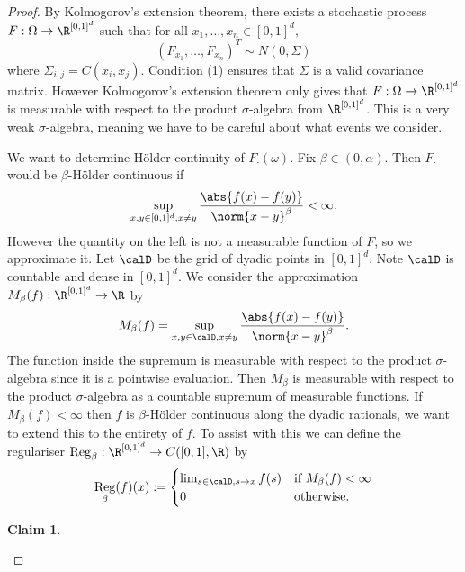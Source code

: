 \documentclass[fontsize=12pt, DIV=10]{scrreprt}
\theoremstyle{mydefn}
\newtheorem{claim}{Claim}
\theoremstyle{remark}
\newcommand{\defeq}{:=}
\DeclareMathOperator{\reg}{Reg}
\begin{document}
\begin{proof}
	By Kolmogorov's extension theorem, there exists a stochastic process $F: \Omega \to \boxspace$ such that for all $x_1, \ldots, x_n \in [0, 1]^d$, 
	\begin{equation}
		(F_{x_1}, \ldots, F_{x_n})^T
		\sim N(0, \Sigma)
	\end{equation}
	where $\Sigma_{i,j} = C(x_i, x_j)$. Condition (1) ensures that $\Sigma$ is a valid covariance matrix. However Kolmogorov's extension theorem only gives that $F: \Omega \to \boxspace$ is measurable with respect to the product $\sigma$-algebra from $\boxspace$. This is a very weak $\sigma$-algebra, meaning we have to be careful about what events we consider.

	We want to determine H\"older continuity of $F_{\cdot}(\omega)$. Fix $\beta \in (0, \alpha)$. Then $F_{\cdot}$ would be $\beta$-H\"older continuous if
	\begin{equation}
		\sup_{x, y \in [0, 1]^d, x \neq y} \frac{\abs{f(x) - f(y)}}{\norm{x - y}^{\beta}} < \infty.
	\end{equation}
	However the quantity on the left is not a measurable function of $F$, so we approximate it. Let $\calD$ be the grid of dyadic points in $[0, 1]^d$. Note $\calD$ is countable and dense in $[0, 1]^d$. We consider the approximation $M_{\beta}(f): \boxspace \to \R$ by
	\begin{equation}
		M_{\beta}(f) = \sup_{x, y \in \calD, x \neq y} \frac{\abs{f(x) - f(y)}}{\norm{x - y}^{\beta}}.
	\end{equation}
	The function inside the supremum is measurable with respect to the product $\sigma$-algebra since it is a pointwise evaluation. Then $M_{\beta}$ is measurable with respect to the product $\sigma$-algebra as a countable supremum of measurable functions. If $M_{\beta}(f) < \infty$ then $f$ is $\beta$-H\"older continuous along the dyadic rationals, we want to extend this to the entirety of $f$. To assist with this we can define the regulariser $\reg_{\beta}: \boxspace \to C([0, 1], \R)$ by
	\begin{equation}
		\reg_{\beta}(f)(x) \defeq 
		\begin{cases}
			\lim_{s \in \calD, s \to x} f(s) & \text{if}\ M_{\beta}(f) < \infty \\
			0 & \text{otherwise}.
		\end{cases}
	\end{equation}
	\newcommand{\regindi}{\ensuremath{\indi_{\{M_{\beta}(f) < \infty\}}}}
	\begin{claim}

\end{claim}
\end{proof}
\end{document}
